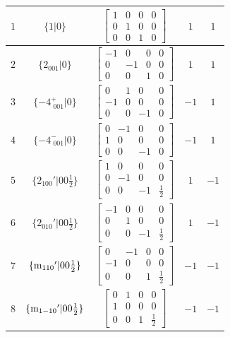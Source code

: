\documentclass[fleqn,8pt]{jsarticle}
\begin{document}
\begin{longtable}{ccccc}
$ 1 $ & $ \{1|0\} $ & $ \begin{bmatrix} 1 & 0 & 0 & 0 \\ 0 & 1 & 0 & 0 \\ 0 & 0 & 1 & 0 \end{bmatrix} $ & $ 1 $ & $ 1 $ \\ \hline
$ 2 $ & $ \{2{}_{001}|0\} $ & $ \begin{bmatrix} -1 & 0 & 0 & 0 \\ 0 & -1 & 0 & 0 \\ 0 & 0 & 1 & 0 \end{bmatrix} $ & $ 1 $ & $ 1 $ \\ \hline
$ 3 $ & $ \{-4^{+}_{\,\,001}|0\} $ & $ \begin{bmatrix} 0 & 1 & 0 & 0 \\ -1 & 0 & 0 & 0 \\ 0 & 0 & -1 & 0 \end{bmatrix} $ & $ -1 $ & $ 1 $ \\ \hline
$ 4 $ & $ \{-4^{-}_{\,\,001}|0\} $ & $ \begin{bmatrix} 0 & -1 & 0 & 0 \\ 1 & 0 & 0 & 0 \\ 0 & 0 & -1 & 0 \end{bmatrix} $ & $ -1 $ & $ 1 $ \\ \hline
$ 5 $ & $ \{2{}_{100}{}'|0 0 \frac{1}{2}\} $ & $ \begin{bmatrix} 1 & 0 & 0 & 0 \\ 0 & -1 & 0 & 0 \\ 0 & 0 & -1 & \frac{1}{2} \end{bmatrix} $ & $ 1 $ & $ -1 $ \\ \hline
$ 6 $ & $ \{2{}_{010}{}'|0 0 \frac{1}{2}\} $ & $ \begin{bmatrix} -1 & 0 & 0 & 0 \\ 0 & 1 & 0 & 0 \\ 0 & 0 & -1 & \frac{1}{2} \end{bmatrix} $ & $ 1 $ & $ -1 $ \\ \hline
$ 7 $ & $ \{{\rm m}_{110}{}'|0 0 \frac{1}{2}\} $ & $ \begin{bmatrix} 0 & -1 & 0 & 0 \\ -1 & 0 & 0 & 0 \\ 0 & 0 & 1 & \frac{1}{2} \end{bmatrix} $ & $ -1 $ & $ -1 $ \\ \hline
$ 8 $ & $ \{{\rm m}_{1-10}{}'|0 0 \frac{1}{2}\} $ & $ \begin{bmatrix} 0 & 1 & 0 & 0 \\ 1 & 0 & 0 & 0 \\ 0 & 0 & 1 & \frac{1}{2} \end{bmatrix} $ & $ -1 $ & $ -1 $ \\
\end{longtable}
\end{document}
